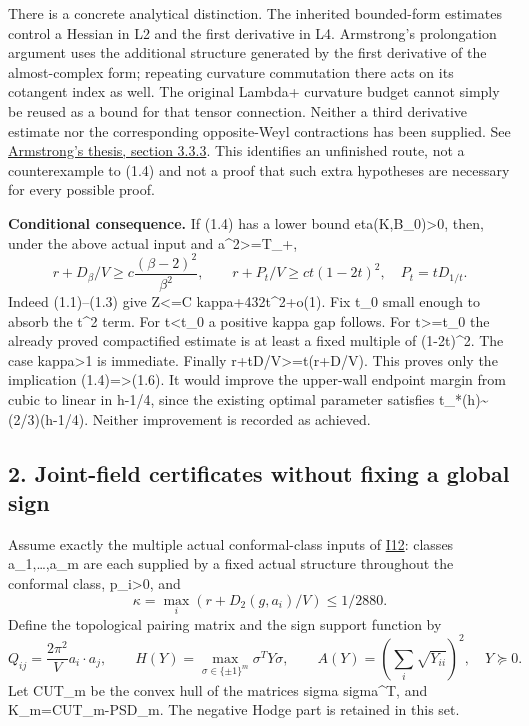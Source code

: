 \documentclass[
  10pt,
]{article}
\begin{document}
There is a concrete analytical distinction. The inherited bounded-form
estimates control a Hessian in L2 and the first derivative in L4.
Armstrong's prolongation argument uses the additional structure
generated by the first derivative of the almost-complex form; repeating
curvature commutation there acts on its cotangent index as well. The
original Lambda+ curvature budget cannot simply be reused as a bound for
that tensor connection. Neither a third derivative estimate nor the
corresponding opposite-Weyl contractions has been supplied. See
\href{https://johnarmstrongmaths.com/publications/resources/thesis.pdf}{Armstrong's
thesis, section 3.3.3}. This identifies an unfinished route, not a
counterexample to (1.4) and not a proof that such extra hypotheses are
necessary for every possible proof.

\textbf{Conditional consequence.} If (1.4) has a lower bound
eta(K,B\_0)\textgreater0, then, under the above actual input and
a\^{}2\textgreater=T\_+, \[
 r+D_\beta/V\ge c\frac{(\beta-2)^2}{\beta^2},\qquad
 r+P_t/V\ge ct(1-2t)^2,\quad P_t=tD_{1/t}.               \tag{1.6}
\] Indeed (1.1)--(1.3) give Z\textless=C kappa+432t\^{}2+o(1). Fix t\_0
small enough to absorb the t\^{}2 term. For t\textless t\_0 a positive
kappa gap follows. For t\textgreater=t\_0 the already proved
compactified estimate is at least a fixed multiple of (1-2t)\^{}2. The
case kappa\textgreater1 is immediate. Finally
r+tD/V\textgreater=t(r+D/V). This proves only the implication
(1.4)=\textgreater(1.6). It would improve the upper-wall endpoint margin
from cubic to linear in h-1/4, since the existing optimal parameter
satisfies t\_*(h)\textasciitilde(2/3)(h-1/4). Neither improvement is
recorded as achieved.

\hypertarget{joint-field-certificates-without-fixing-a-global-sign}{%
\subsection{2. Joint-field certificates without fixing a global
sign}\label{joint-field-certificates-without-fixing-a-global-sign}}

Assume exactly the multiple actual conformal-class inputs of
\href{../mathematics/current/line1_period_inertia.md}{I12}: classes
a\_1,\ldots,a\_m are each supplied by a fixed actual structure
throughout the conformal class, p\_i\textgreater0, and \[
 \kappa=\max_i(r+D_2(g,a_i)/V)\le1/2880.
\] Define the topological pairing matrix and the sign support function
by \[
 Q_{ij}=\frac{2\pi^2}{V}a_i\cdot a_j,\qquad
 H(Y)=\max_{\sigma\in\{\pm1\}^m}\sigma^T Y\sigma,\qquad
 A(Y)=\left(\sum_i\sqrt{Y_{ii}}\right)^2,
 \quad Y\succeq0.
\] Let CUT\_m be the convex hull of the matrices sigma sigma\^{}T, and
K\_m=CUT\_m-PSD\_m. The negative Hodge part is retained in this set.
\end{document}
